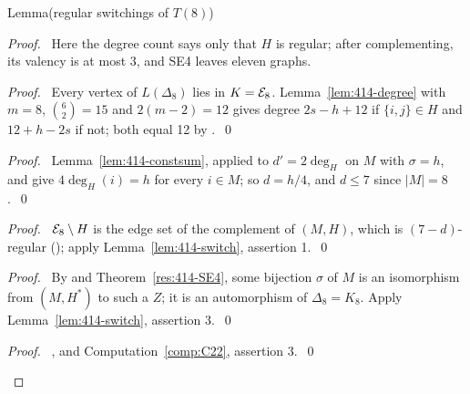 \begin{namedresult}{Lemma}{(regular switchings of $T(8)$)}\label{lem:414-E8}
\end{namedresult}
\begin{proof}
 \pfsketch\ Here the degree count says only that $H$ is regular; after complementing, its valency
 is at most 3, and SE4 leaves eleven graphs.
 \begin{proof}\pf\ Every vertex of $L(\Delta_8)$ lies in $K=\mathcal E_8$. Lemma~\ref{lem:414-degree} with
  $m=8$, $\binom62=15$ and $2(m-2)=12$ gives degree $2s-h+12$ if $\{i,j\}\in H$ and $12+h-2s$ if
  not; both equal 12 by .~\qed\end{proof}
 \begin{proof}\pf\ Lemma~\ref{lem:414-constsum}, applied to $d'=2\deg_H$ on $M$ with $\sigma=h$, and
   give $4\deg_H(i)=h$ for every $i\in M$; so $d=h/4$, and $d\le7$ since
  $|M|=8$.~\qed\end{proof}
 \begin{proof}\pf\ $\mathcal E_8\setminus H$ is the edge set of the complement of $(M,H)$, which is
  $(7-d)$-regular (); apply
  Lemma~\ref{lem:414-switch}, assertion 1.~\qed\end{proof}
 \begin{proof}\pf\ By  and Theorem~\ref{res:414-SE4}, some bijection
  $\sigma$ of $M$ is an isomorphism from $(M,H^*)$ to such a $Z$; it is an automorphism of
  $\Delta_8=K_8$. Apply Lemma~\ref{lem:414-switch}, assertion 3.~\qed\end{proof}
 \qedstep
 \begin{proof}\pf\ ,  and
  Computation~\ref{comp:C22}, assertion 3.~\qed\end{proof}
\end{proof}

